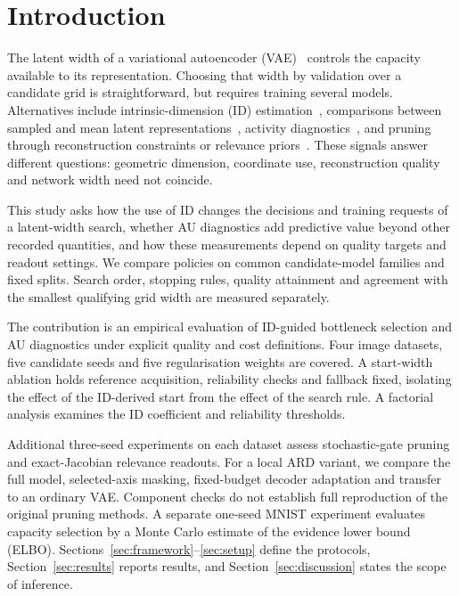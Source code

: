 \documentclass[make,article,submit,pdftex,moreauthors]{Definitions/mdpi}
\begin{document}
\section{Introduction}\label{sec:intro}

The latent width of a variational autoencoder (VAE)~\cite{kingma2014vae}
controls the capacity available to its representation. Choosing that width
by validation over a candidate grid is straightforward, but requires
training several models. Alternatives include intrinsic-dimension (ID)
estimation~\cite{facco2017twonn,levina2005mle}, comparisons between sampled
and mean latent representations~\cite{bonheme2022fondue}, activity
diagnostics~\cite{burda2016iwae,bonheme2023active}, and pruning through
reconstruction constraints or relevance priors~\cite{deboom2020geco,saha2025ardvae}.
These signals answer different questions: geometric dimension, coordinate
use, reconstruction quality and network width need not coincide.

This study asks how the use of ID changes the decisions and training
requests of a latent-width search, whether AU diagnostics add predictive
value beyond other recorded quantities, and how these measurements depend
on quality targets and readout settings. We compare policies on common
candidate-model families and fixed splits. Search order, stopping rules,
quality attainment and agreement with the smallest qualifying grid width
are measured separately.

The contribution is an empirical evaluation of ID-guided bottleneck
selection and AU diagnostics under explicit quality and cost definitions.
Four image datasets, five candidate seeds and five regularisation weights
are covered. A start-width ablation holds reference acquisition,
reliability checks and fallback fixed, isolating the effect of the
ID-derived start from the effect of the search rule. A factorial analysis
examines the ID coefficient and reliability thresholds.

Additional three-seed experiments on each dataset assess stochastic-gate
pruning and exact-Jacobian relevance readouts. For a local ARD variant,
we compare the full model, selected-axis masking, fixed-budget decoder
adaptation and transfer to an ordinary VAE. Component checks do not
establish full reproduction of the original pruning methods. A separate
one-seed MNIST experiment evaluates capacity selection by a Monte Carlo
estimate of the evidence lower bound (ELBO).
Sections~\ref{sec:framework}--\ref{sec:setup} define the protocols,
Section~\ref{sec:results} reports results, and
Section~\ref{sec:discussion} states the scope of inference.
\end{document}
